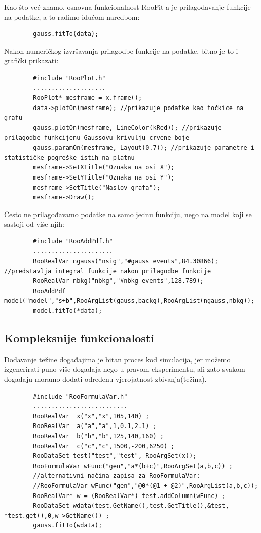 \documentclass[12pt,a4paper,oneside]{article}
\begin{document}
\begin{linenumbers}
		
		
		Kao što već znamo, osnovna funkcionalnost RooFit-a je prilagođavanje funkcije na podatke, a to radimo idućom naredbom:
		
		\begin{verbatim}
		gauss.fitTo(data);
		\end{verbatim}
		
		Nakon numeričkog izvršavanja prilagodbe funkcije na podatke, bitno je to i grafički prikazati:
		
		\begin{verbatim}
		#include "RooPlot.h"
		....................
		RooPlot* mesframe = x.frame();
		data->plotOn(mesframe); //prikazuje podatke kao točkice na grafu
		gauss.plotOn(mesframe, LineColor(kRed)); //prikazuje prilagodbe funkcijenu Gaussovu krivulju crvene boje
		gauss.paramOn(mesframe, Layout(0.7)); //prikazuje parametre i statističke pogreške istih na platnu 
		mesframe->SetXTitle("Oznaka na osi X");
		mesframe->SetYTitle("Oznaka na osi Y");
		mesframe->SetTitle("Naslov grafa");
		mesframe->Draw();
		\end{verbatim}
		
		Često ne prilagođavamo podatke na samo jednu funkciju, nego na model koji se sastoji od više njih:
		
		\begin{verbatim}
		#include "RooAddPdf.h"
		......................
		RooRealVar ngauss("nsig","#gauss events",84.30866); //predstavlja integral funkcije nakon prilagodbe funkcije
		RooRealVar nbkg("nbkg","#nbkg events",128.789);
		RooAddPdf model("model","s+b",RooArgList(gauss,backg),RooArgList(ngauss,nbkg));
		model.fitTo(*data);
		\end{verbatim}
		
		\subsection{Kompleksnije funkcionalosti}
		Dodavanje težine događajima je bitan proces kod simulacija, jer možemo izgenerirati puno više događaja nego u pravom eksperimentu, ali zato svakom događaju moramo dodati određenu vjerojatnost zbivanja(težina).
		\begin{verbatim}
		#include "RooFormulaVar.h"
		..........................
		RooRealVar  x("x","x",105,140) ;
		RooRealVar  a("a","a",1,0.1,2.1) ;
		RooRealVar  b("b","b",125,140,160) ;
		RooRealVar  c("c","c",1500,-200,6250) ;
		RooDataSet test("test","test", RooArgSet(x));
		RooFormulaVar wFunc("gen","a*(b+c)",RooArgSet(a,b,c)) ;
		//alternativni načina zapisa za RooFormulaVar:
		//RooFormulaVar wFunc("gen","@0*(@1 + @2)",RooArgList(a,b,c));
		RooRealVar* w = (RooRealVar*) test.addColumn(wFunc) ;
		RooDataSet wdata(test.GetName(),test.GetTitle(),&test, *test.get(),0,w->GetName()) ;
		gauss.fitTo(wdata);
		\end{verbatim}
		

\end{linenumbers}
\end{document}
